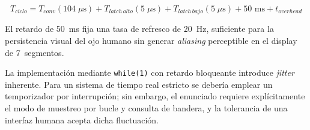 \documentclass[12pt, a4paper]{article}
\begin{document}
\[
    T_{ciclo} = T_{conv}(104\;\mu\text{s})
              + T_{latch\,alto}(5\;\mu\text{s})
              + T_{latch\,bajo}(5\;\mu\text{s})
              + 50\text{ ms}
              + t_{overhead}
\]

El retardo de 50~ms fija una tasa de refresco de 20~Hz, suficiente para la
persistencia visual del ojo humano sin generar \emph{aliasing} perceptible en
el display de 7~segmentos.

La implementación mediante \texttt{while(1)} con retardo bloqueante introduce
\emph{jitter} inherente. Para un sistema de tiempo real estricto se debería
emplear un temporizador por interrupción; sin embargo, el enunciado requiere
explícitamente el modo de muestreo por bucle y consulta de bandera, y la
tolerancia de una interfaz humana acepta dicha fluctuación.
\end{document}

